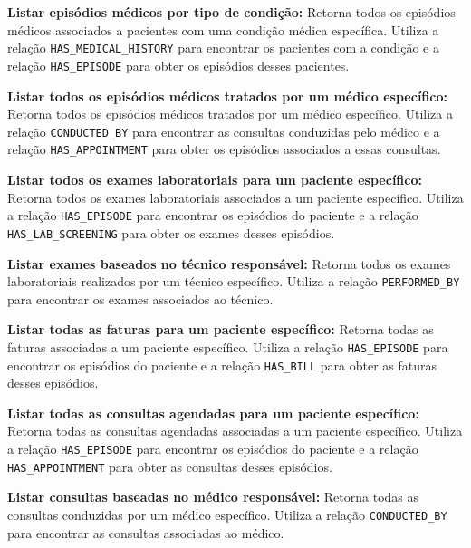 \vspace{0.15cm}
\textbf{Listar episódios médicos por tipo de condição:} Retorna todos os episódios médicos associados a pacientes com uma condição médica específica. Utiliza a relação \texttt{HAS\_MEDICAL\_HISTORY} para encontrar os pacientes com a condição e a relação \texttt{HAS\_EPISODE} para obter os episódios desses pacientes.

\vspace{0.15cm}
\textbf{Listar todos os episódios médicos tratados por um médico específico:} Retorna todos os episódios médicos tratados por um médico específico. Utiliza a relação \texttt{CONDUCTED\_BY} para encontrar as consultas conduzidas pelo médico e a relação \texttt{HAS\_APPOINTMENT} para obter os episódios associados a essas consultas.

\vspace{0.15cm}
\textbf{Listar todos os exames laboratoriais para um paciente específico:} Retorna todos os exames laboratoriais associados a um paciente específico. Utiliza a relação \texttt{HAS\_EPISODE} para encontrar os episódios do paciente e a relação \texttt{HAS\_LAB\_SCREENING} para obter os exames desses episódios.

\vspace{0.15cm}
\textbf{Listar exames baseados no técnico responsável:} Retorna todos os exames laboratoriais realizados por um técnico específico. Utiliza a relação \texttt{PERFORMED\_BY} para encontrar os exames associados ao técnico.

\vspace{0.15cm}
\textbf{Listar todas as faturas para um paciente específico:} Retorna todas as faturas associadas a um paciente específico. Utiliza a relação \texttt{HAS\_EPISODE} para encontrar os episódios do paciente e a relação \texttt{HAS\_BILL} para obter as faturas desses episódios.

\vspace{0.15cm}
\textbf{Listar todas as consultas agendadas para um paciente específico:} Retorna todas as consultas agendadas associadas a um paciente específico. Utiliza a relação \texttt{HAS\_EPISODE} para encontrar os episódios do paciente e a relação \texttt{HAS\_APPOINTMENT} para obter as consultas desses episódios.

\vspace{0.15cm}
\textbf{Listar consultas baseadas no médico responsável:} Retorna todas as consultas conduzidas por um médico específico. Utiliza a relação \texttt{CONDUCTED\_BY} para encontrar as consultas associadas ao médico.

